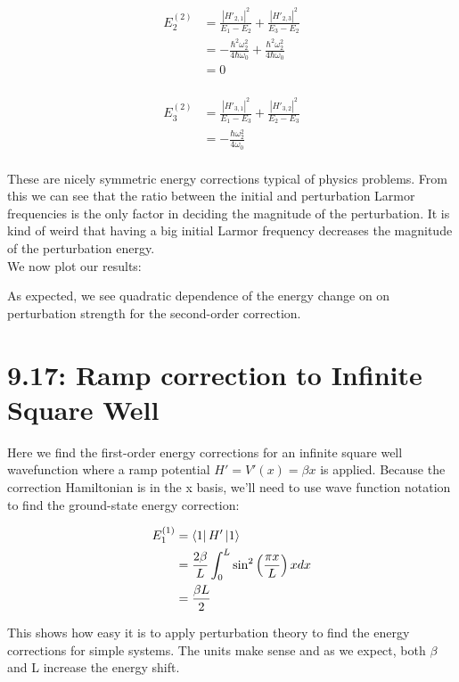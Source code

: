 \documentclass[10pt]{article} %
\begin{document}
\begin{align*}
  E_2^{(2)} &=
  \frac{|H'_{2,1}|^2}{E_1 - E_2} +
  \frac{|H'_{2,3}|^2}{E_3 - E_2}\\
  &= -\frac{\hbar^2\omega_2^2}{4\hbar\omega_0} + \frac{\hbar^2\omega_2^2}{4\hbar\omega_0}\\
  &= 0\\
\end{align*}

\begin{align*}
  E_3^{(2)} &=
  \frac{|H'_{3,1}|^2}{E_1 - E_3} +
  \frac{|H'_{3,2}|^2}{E_2 - E_3}\\
  &= -\frac{\hbar\omega_2^2}{4\omega_0}\\
\end{align*}

These are nicely symmetric energy corrections typical of physics problems. From this we can see
that the ratio between the initial and perturbation Larmor frequencies is the only factor in
deciding the magnitude of the perturbation. It is kind of weird that having a big initial
Larmor frequency decreases the magnitude of the perturbation energy.\\

We now plot our results:\\
\vspace{7cm}


As expected, we see quadratic dependence of the energy change on on perturbation strength for the
second-order correction.
\section{9.17: Ramp correction to Infinite Square Well}
Here we find the first-order energy corrections for an infinite square well wavefunction where a
ramp potential $H' = V'(x) = \beta x$ is applied. Because the correction Hamiltonian is in the
x basis, we'll need to use wave function notation to find the ground-state energy correction:

\begin{align*}
  E_1^{(1)} &= \bra{1}H'\ket{1}\\
  &= \frac{2\beta}{L}\int_0^L \sin^2\left(\frac{\pi x}{L}\right)x dx\\
  &= \frac{\beta L}{2}\\
\end{align*}

This shows how easy it is to apply perturbation theory to find the energy corrections for simple
systems. The units make sense and as we expect, both $\beta$ and L increase the energy shift.\\
\end{document}
